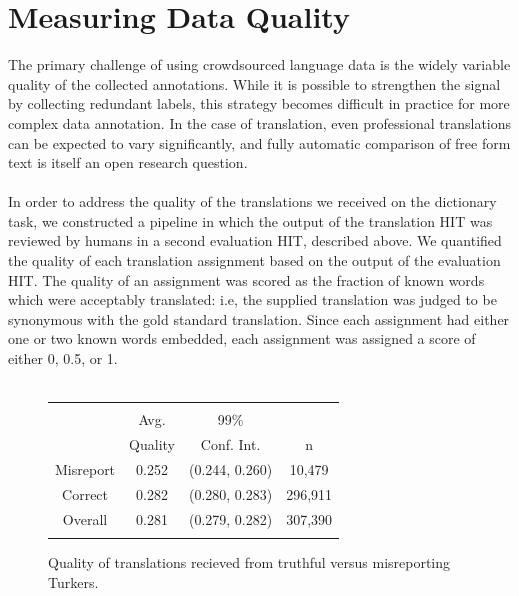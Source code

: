 \documentclass[11pt]{article}
\begin{document}
\section{Measuring Data Quality}
The primary challenge of using crowdsourced language data is the widely variable quality of the collected annotations. While it is possible to strengthen the signal by collecting redundant labels, this strategy becomes difficult in practice for more complex data annotation. In the case of translation, even professional translations can be expected to vary significantly, and fully automatic comparison of free form text is itself an open research question.\\\\ 
In order to address the quality of the translations we received on the dictionary task, we constructed a pipeline in which the output of the translation HIT was reviewed by humans in a second evaluation HIT, described above. We quantified the quality of each translation assignment based on the output of the evaluation HIT. The quality of an assignment was scored as the fraction of known words which were acceptably translated: i.e, the supplied translation was judged to be synonymous with the gold standard translation. Since each assignment had either one or two known words embedded, each assignment was assigned a score of either 0, 0.5, or 1.\\\\

\begin{figure}[h]
\centering
\begin{tabular}{cccc}\hline\hline\\
&Avg. & 99\%&\\
&Quality & Conf. Int.&n\\
Misreport&0.252&(0.244, 0.260)&10,479\\
Correct&0.282&(0.280, 0.283)&296,911\\
Overall&0.281&(0.279, 0.282)&307,390\\\\
\hline\hline
\end{tabular}
\label{mism-tab}
\caption{Quality of translations recieved from truthful versus misreporting Turkers.}
\end{figure}
\end{document}

